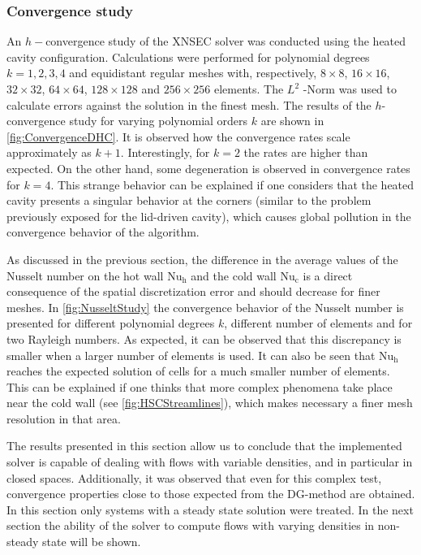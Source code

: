 

\subsubsection{Convergence study}\label{ssec:ConvStudyHeatedCavity}
An $h-$convergence study of the XNSEC solver was conducted using the heated cavity configuration. Calculations were performed for polynomial degrees $k = {1,2,3,4}$ and equidistant regular meshes with, respectively, $8\times8$, $16\times16$, $32\times32$, $64\times64$, $128\times128$ and $256\times256$ elements.  The $L^2$ -Norm was used to calculate errors against the solution in the finest mesh. The results of the $h$-convergence study for varying polynomial orders $k$ are shown in \cref{fig:ConvergenceDHC}. It is observed how the convergence rates scale approximately as $k+1$. Interestingly, for $k=2$ the rates are higher than expected. On the other hand, some degeneration is observed in convergence rates for $k = 4$. This strange behavior can be explained if one considers that the heated cavity presents a singular behavior at the corners (similar to the problem previously exposed for the lid-driven cavity), which causes global pollution in the convergence behavior of the algorithm. 
 
As discussed in the previous section, the difference in the average values of the Nusselt number on the hot wall $\text{Nu}_\text{h}$  and the cold wall $\text{Nu}_\text{c}$ is a direct consequence of the spatial discretization error and should decrease for finer meshes. In \cref{fig:NusseltStudy} the convergence behavior of the Nusselt number is presented for different polynomial degrees $k$, different number of elements and for two Rayleigh numbers. As expected, it can be observed that this discrepancy is smaller when a larger number of elements is used. It can also be seen that  $\text{Nu}_\text{h}$ reaches the expected solution of cells for a much smaller number of elements. This can be explained if one thinks that more complex phenomena take place near the cold wall (see \cref{fig:HSCStreamlines}), which makes necessary a finer mesh resolution in that area.

The results presented in this section allow us to conclude that the implemented solver is capable of dealing with flows with variable densities, and in particular in closed spaces. Additionally, it was observed that even for this complex test, convergence properties close to those expected from the DG-method are obtained. In this section only systems with a steady state solution were treated. In the next section the ability of the solver to compute flows with varying densities in non-steady state will be shown.


